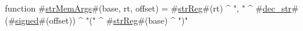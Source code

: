function #\hyperref[zstrMemArgs]{strMemArgs}#(base, rt, offset) = #\hyperref[zstrReg]{strReg}#(rt) ^ ", " ^ #\hyperref[zdeczystr]{dec\_str}#(#\hyperref[zsigned]{signed}#(offset)) ^ "(" ^ #\hyperref[zstrReg]{strReg}#(base) ^ ")"
